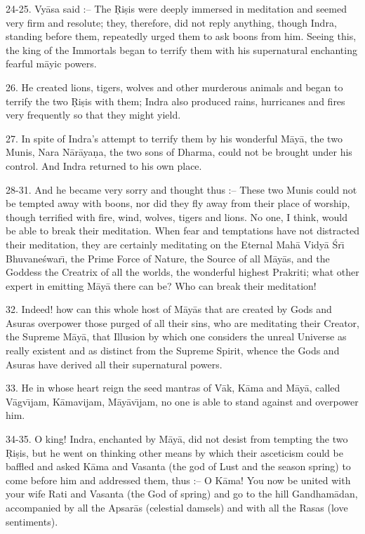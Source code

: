 24-25. Vy\=asa said :-- The \d{R}i\d{s}is were deeply immersed in meditation and seemed very firm and resolute; they, therefore, did not reply anything, though Indra, standing before them, repeatedly urged them to ask boons from him. Seeing this, the king of the Immortals began to terrify them with his supernatural enchanting fearful m\=ayic powers.

26. He created lions, tigers, wolves and other murderous animals and began to terrify the two \d{R}i\d{s}is with them; Indra also produced rains, hurricanes and fires very frequently so that they might yield.

27. In spite of Indra's attempt to terrify them by his wonderful M\=ay\=a, the two Munis, Nara N\=ar\=aya\d{n}a, the two sons of Dharma, could not be brought under his control. And Indra returned to his own place.

28-31. And he became very sorry and thought thus :-- These two Munis could not be tempted away with boons, nor did they fly away from their place of worship, though terrified with fire, wind, wolves, tigers and lions. No one, I think, would be able to break their meditation. When fear and temptations have not distracted their meditation, they are certainly meditating on the Eternal Mah\=a Vidy\=a \'Sr\={\i} Bhuvane\'swar\={\i}, the Prime Force of Nature, the Source of all M\=ay\=as, and the Goddess the Creatrix of all the worlds, the wonderful highest Prakriti; what other expert in emitting M\=ay\=a there can be? Who can break their meditation!

32. Indeed! how can this whole host of M\=ay\=as that are created by Gods and Asuras overpower those purged of all their sins, who are meditating their Creator, the Supreme M\=ay\=a, that Illusion by which one considers the unreal Universe as really existent and as distinct from the Supreme Spirit, whence the Gods and Asuras have derived all their supernatural powers.

33. He in whose heart reign the seed mantras of V\=ak, K\=ama and M\=ay\=a, called V\=agv\={\i}jam, K\=amavijam, M\=ay\=av\={\i}jam, no one is able to stand against and overpower him.

34-35. O king! Indra, enchanted by M\=ay\=a, did not desist from tempting the two \d{R}i\d{s}is, but he went on thinking other means by which their asceticism could be baffled and asked K\=ama and Vasanta (the god of Lust and the season spring) to come before him and addressed them, thus :-- O K\=ama! You now be united with your wife Rati and Vasanta (the God of spring) and go to the hill Gandham\=adan, accompanied by all the Apsar\=as (celestial damsels) and with all the Rasas (love sentiments).

